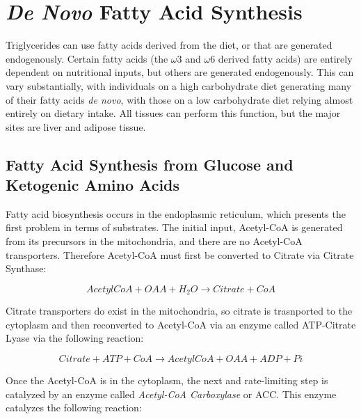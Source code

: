 \documentclass{tufte-handout}
\begin{document}
\section{\textit{De Novo} Fatty Acid Synthesis}

Triglycerides can use fatty acids derived from the diet, or that are generated endogenously.  Certain fatty acids (the $\omega$3 and $\omega$6 derived fatty acids) are entirely dependent on nutritional inputs, but others are generated endogenously.  This can vary substantially, with individuals on a high carbohydrate diet generating many of their fatty acids \textit{de novo}, with those on a low carbohydrate diet relying almost entirely on dietary intake.  All tissues can perform this function, but the major sites are liver and adipose tissue.

\subsection{Fatty Acid Synthesis from Glucose and Ketogenic Amino Acids}

Fatty acid biosynthesis occurs in the endoplasmic reticulum, which presents the first problem in terms of substrates.  The initial input, Acetyl-CoA is generated from its precursors in the mitochondria, and there are no Acetyl-CoA transporters.  Therefore Acetyl-CoA must first be converted to Citrate via Citrate Synthase:

\begin{equation}\label{eq:acl}
AcetylCoA + OAA + H_2O \rightarrow Citrate + CoA
\end{equation}

Citrate transporters do exist in the mitochondria, so citrate is trasnported to the cytoplasm and then reconverted to Acetyl-CoA via an enzyme called ATP-Citrate Lyase via the following reaction:

\begin{equation}\label{eq:acl}
Citrate + ATP + CoA \rightarrow AcetylCoA + OAA + ADP + Pi
\end{equation}

Once the Acetyl-CoA is in the cytoplasm, the next and rate-limiting step is catalyzed by an enzyme called \emph{Acetyl-CoA Carboxylase} or ACC.  This enzyme catalyzes the following reaction:
\end{document}
